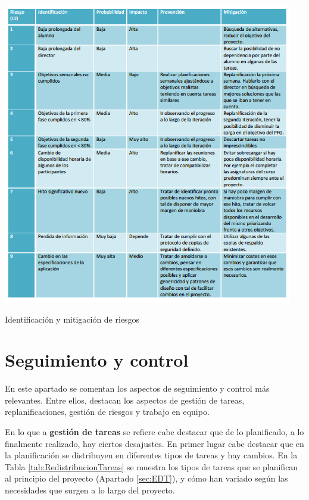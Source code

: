 \begin{table}
\begin{center}
\includegraphics[width=0.95\textwidth]{figs/6-Riesgos.png}
\end{center}
\caption{Identificación y mitigación de riesgos}
\label{tab:Riesgos}
\end{table}


\section{Seguimiento y control}
\label{sec:Seguimiento}

En este apartado se comentan los aspectos de seguimiento y control más relevantes. Entre ellos, destacan los aspectos de gestión de tareas, replanificaciones, gestión de riesgos y trabajo en equipo.

En lo que a \textbf{gestión de tareas} se refiere cabe destacar que de lo planificado, a lo finalmente realizado, hay ciertos desajustes. En primer lugar cabe destacar que en la planificación se distribuyen en diferentes tipos de tareas y hay cambios. En la Tabla \ref{tab:RedistribucionTareas} se muestra los tipos de tareas que se planifican al principio del proyecto (Apartado \ref{sec:EDT}), y cómo han variado según las necesidades que surgen a lo largo del proyecto.

